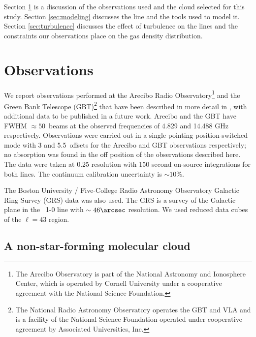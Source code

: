 
Section \ref{sec:observations} is a discussion of the observations used and the
cloud selected  for this study.  Section  \ref{sec:modeling} discusses the
\formaldehyde line and the tools used to model it.  Section
\ref{sec:turbulence} discusses the effect of turbulence on the \formaldehyde
lines and the constraints our observations place on the gas density
distribution.


\section{Observations}
\label{sec:observations}
We report \formaldehyde observations performed at the Arecibo Radio
Observatory\footnote{The Arecibo Observatory is part of the National Astronomy
and Ionosphere Center, which is operated by Cornell University under a
cooperative agreement with the National Science Foundation.  } and the Green
Bank Telescope (GBT)\footnote{ The National Radio Astronomy Observatory operates the
GBT and VLA and is a facility of the National Science Foundation operated under
cooperative agreement by Associated Universities, Inc.  } that have been 
described in more detail in \citet{Ginsburg2011a}, with additional data to be
published in a future work.  Arecibo and
the GBT have FWHM $\approx50$\arcsec\ beams at the observed frequencies of
4.829 and 14.488 GHz respectively.  Observations were carried out in a single
pointing position-switched mode with 3 and 5.5\arcmin\ offsets for the Arecibo
and GBT observations respectively; no absorption was found in the off position
of the observations described here.  The data were taken at 0.25 \kms
resolution with 150 second on-source integrations for both lines.  The continuum
calibration uncertainty is $\sim 10\%$.

The Boston University / Five-College Radio Astronomy Observatory Galactic Ring
Survey (GRS) \thirteenco data was also used.  The GRS \citep{Jackson2006a}
is a survey of the Galactic plane in the \thirteenco\ 1-0 line with $\sim
46\arcsec$ resolution.  We used reduced data cubes of the $\ell=43$ region.

\subsection{\GRSMC A non-star-forming molecular cloud}

